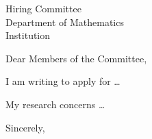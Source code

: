 \documentclass[11pt]{letter}
\begin{document}
\begin{letter}{Hiring Committee\\Department of Mathematics\\Institution}
\opening{Dear Members of the Committee,}
I am writing to apply for \dots

My research concerns \dots

\closing{Sincerely,}
\end{letter}
\end{document}
